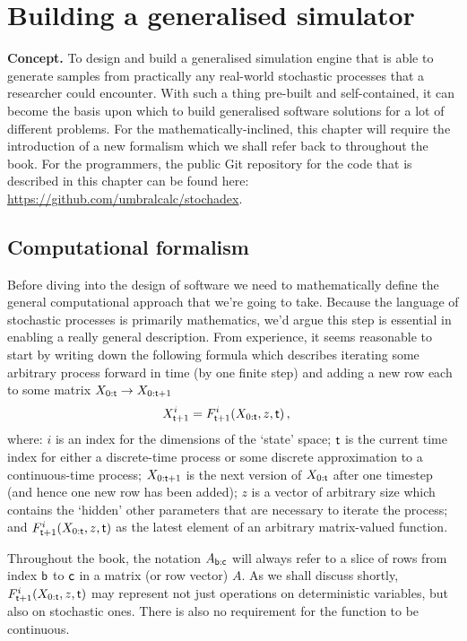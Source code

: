 \chapter{\sffamily Building a generalised simulator}

{\bfseries\sffamily Concept.} To design and build a generalised simulation engine that is able to generate samples from practically any real-world stochastic processes that a researcher could encounter. With such a thing pre-built and self-contained, it can become the basis upon which to build generalised software solutions for a lot of different problems. For the mathematically-inclined, this chapter will require the introduction of a new formalism which we shall refer back to throughout the book. For the programmers, the public Git repository for the code that is described in this chapter can be found here: \href{https://github.com/umbralcalc/stochadex}{https://github.com/umbralcalc/stochadex}.

\section{\sffamily Computational formalism}

Before diving into the design of software we need to mathematically define the general computational approach that we're going to take. Because the language of stochastic processes is primarily mathematics, we'd argue this step is essential in enabling a really general description. From experience, it seems reasonable to start by writing down the following formula which describes iterating some arbitrary process forward in time (by one finite step) and adding a new row each to some matrix $X_{0:{\sf t}} \rightarrow X_{0:{\sf t}+1}$
\begin{align}
X^{i}_{{\sf t}+1} &= F^{i}_{{\sf t}+1}(X_{0:{\sf t}},z,{\sf t}) \,, \label{eq:x-step-def}
\end{align}
where: $i$ is an index for the dimensions of the `state' space; ${\sf t}$ is the current time index for either a discrete-time process or some discrete approximation to a continuous-time process; $X_{0:{\sf t}+1}$ is the next version of $X_{0:{\sf t}}$ after one timestep (and hence one new row has been added); $z$ is a vector of arbitrary size which contains the `hidden' other parameters that are necessary to iterate the process; and $F^i_{{\sf t}+1}(X_{0:{\sf t}},z,{\sf t})$ as the latest element of an arbitrary matrix-valued function. 

Throughout the book, the notation $A_{{{\sf b}:{\sf c}}}$ will always refer to a slice of rows from index ${\sf b}$ to ${\sf c}$ in a matrix (or row vector) $A$. As we shall discuss shortly, $F^i_{{\sf t}+1}(X_{0:{\sf t}},z,{\sf t})$ may represent not just operations on deterministic variables, but also on stochastic ones. There is also no requirement for the function to be continuous.

